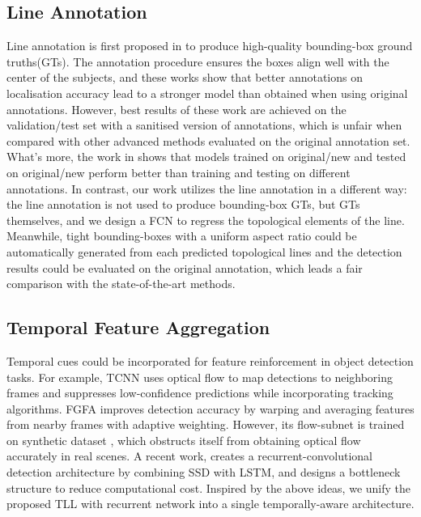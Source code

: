 \documentclass[runningheads]{llncs}
\begin{document}
\subsection{Line Annotation}
Line annotation is first proposed in \cite{NewCal,CityPersons} to produce high-quality bounding-box ground truths(GTs). The annotation procedure ensures the boxes align well with the center of the subjects, and these works show that better annotations on localisation accuracy lead to a stronger model than obtained when using original annotations. However, best results of these work are achieved on the validation/test set with a sanitised version of annotations, which is unfair when compared with other advanced methods evaluated on the original annotation set. What's more, the work in \cite{NewCal} shows that models trained on original/new and tested on original/new perform better than training and testing on different annotations. In contrast, our work utilizes the line annotation in a different way: the line annotation is not used to produce bounding-box GTs, but GTs themselves, and we design a FCN to regress the topological elements of the line. Meanwhile, tight bounding-boxes with a uniform aspect ratio could be automatically generated from each predicted topological lines and the detection results could be evaluated on the original annotation, which leads a fair comparison with the state-of-the-art methods.
\subsection{Temporal Feature Aggregation}
Temporal cues could be incorporated for feature reinforcement in object detection tasks. For example, TCNN \cite{TCNN} uses optical flow to map detections to neighboring frames and suppresses low-confidence predictions while incorporating tracking algorithms. FGFA \cite{FGFA} improves detection accuracy by warping and averaging features from nearby frames with adaptive weighting. However, its flow-subnet is trained on synthetic dataset \cite{FlowNet}, which obstructs itself from obtaining optical flow accurately in real scenes. A recent work, \cite{VOD} creates a recurrent-convolutional detection architecture by combining SSD \cite{SSD} with LSTM, and designs a bottleneck structure to reduce computational cost. Inspired by the above ideas, we unify the proposed TLL with recurrent network into a single temporally-aware architecture.
\end{document}
